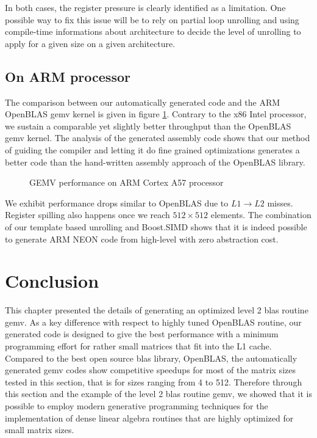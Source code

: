 \documentclass[../main]{subfiles}
\begin{document}
In both cases, the register pressure is clearly identified as a
limitation. One possible way to fix this issue will be to rely
on partial loop unrolling and using compile-time informations
about architecture to decide the level of unrolling to apply for
a given size on a given architecture.

\subsection{
  On ARM processor
}

The comparison between our automatically generated code
and the ARM OpenBLAS \gls{gemv} kernel is given in figure \ref{fig:gemv-arm-bench}.
Contrary to the x86 Intel processor, we sustain a comparable
yet slightly better throughput than the OpenBLAS \gls{gemv}
kernel. The analysis of the generated assembly code shows
that our method of guiding the compiler and letting it do
fine grained optimizations generates a better code than the
hand-written assembly approach of the OpenBLAS library.

\begin{figure}[h]
\fontsize{8}{10}\selectfont

\caption{
  GEMV performance on ARM Cortex A57 processor
}
\label{fig:gemv-arm-bench}
\end{figure}

We exhibit performance drops similar to OpenBLAS due to
$L1 \rightarrow L2$ misses. Register spilling also happens once we reach
$512 \times 512$ elements. The combination of our template based
unrolling and Boost.SIMD shows that it is indeed possible to
generate ARM NEON code from high-level \cpp with zero
abstraction cost.

\section{
  Conclusion
}

This chapter presented the details of generating an optimized
level 2 \gls{blas} routine \gls{gemv}. As a key difference with respect
to highly tuned OpenBLAS routine, our generated code
is designed to give the best performance with a minimum
programming effort for rather small matrices that fit into the
L1 cache. Compared to the best open source \gls{blas} library,
OpenBLAS, the automatically generated \gls{gemv} codes show
competitive speedups for most of the matrix sizes tested in
this section, that is for sizes ranging from 4 to 512. Therefore
through this section and the example of the level 2 \gls{blas}
routine \gls{gemv}, we showed that it is possible to employ modern
generative programming techniques for the implementation
of dense linear algebra routines that are highly optimized for
small matrix sizes.
\end{document}
